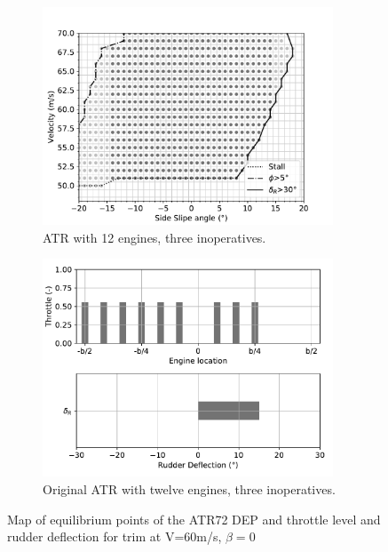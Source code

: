 \begin{figure}
	\begin{subfigure}{0.49\textwidth}
		\includegraphics[width=0.95\textwidth]{originalMapBetaVelfin1Eng15RudFalse}
		\caption{ATR with 12 engines, three inoperatives.}
		\label{fig:originalfin1_15engine}
	\end{subfigure}
	\begin{subfigure}{0.49\textwidth}
		\includegraphics[width=0.95\textwidth]{Defloriginalfin1Eng15RudFalse}
		\caption{Original ATR with twelve engines, three inoperatives.}
		\label{fig:Defloriginalfin1_15engine}
	\end{subfigure}
	\caption{Map of equilibrium points of the ATR72 DEP and throttle level and rudder deflection for trim at V=60m/s, $\beta=0$} \label{DeflOrignialeNoDiffThrust}
\end{figure}

